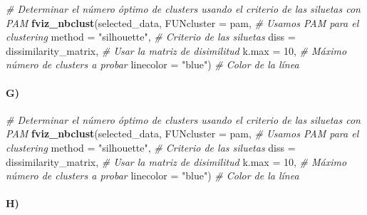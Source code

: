 \documentclass[
]{article}
\newenvironment{Shaded}{\begin{snugshade}}{\end{snugshade}}
\newcommand{\AttributeTok}[1]{\textcolor[rgb]{0.13,0.29,0.53}{#1}}
\newcommand{\CommentTok}[1]{\textcolor[rgb]{0.56,0.35,0.01}{\textit{#1}}}
\newcommand{\DecValTok}[1]{\textcolor[rgb]{0.00,0.00,0.81}{#1}}
\newcommand{\FunctionTok}[1]{\textcolor[rgb]{0.13,0.29,0.53}{\textbf{#1}}}
\newcommand{\NormalTok}[1]{#1}
\newcommand{\StringTok}[1]{\textcolor[rgb]{0.31,0.60,0.02}{#1}}
\begin{document}
\begin{Shaded}
\begin{Highlighting}[]
\CommentTok{\# Determinar el número óptimo de clusters usando el criterio de las siluetas con PAM}
\FunctionTok{fviz\_nbclust}\NormalTok{(selected\_data, }
             \AttributeTok{FUNcluster =}\NormalTok{ pam,            }\CommentTok{\# Usamos PAM para el clustering}
             \AttributeTok{method =} \StringTok{"silhouette"}\NormalTok{,       }\CommentTok{\# Criterio de las siluetas}
             \AttributeTok{diss =}\NormalTok{ dissimilarity\_matrix, }\CommentTok{\# Usar la matriz de disimilitud}
             \AttributeTok{k.max =} \DecValTok{10}\NormalTok{,                 }\CommentTok{\# Máximo número de clusters a probar}
             \AttributeTok{linecolor =} \StringTok{"blue"}\NormalTok{)         }\CommentTok{\# Color de la línea}
\end{Highlighting}
\end{Shaded}

\hypertarget{g-3}{%
\paragraph{G)}\label{g-3}}

\begin{Shaded}
\begin{Highlighting}[]
\CommentTok{\# Determinar el número óptimo de clusters usando el criterio de las siluetas con PAM}
\FunctionTok{fviz\_nbclust}\NormalTok{(selected\_data, }
             \AttributeTok{FUNcluster =}\NormalTok{ pam,            }\CommentTok{\# Usamos PAM para el clustering}
             \AttributeTok{method =} \StringTok{"silhouette"}\NormalTok{,       }\CommentTok{\# Criterio de las siluetas}
             \AttributeTok{diss =}\NormalTok{ dissimilarity\_matrix, }\CommentTok{\# Usar la matriz de disimilitud}
             \AttributeTok{k.max =} \DecValTok{10}\NormalTok{,                 }\CommentTok{\# Máximo número de clusters a probar}
             \AttributeTok{linecolor =} \StringTok{"blue"}\NormalTok{)         }\CommentTok{\# Color de la línea}
\end{Highlighting}
\end{Shaded}

\hypertarget{h-3}{%
\paragraph{H)}\label{h-3}}
\end{document}
